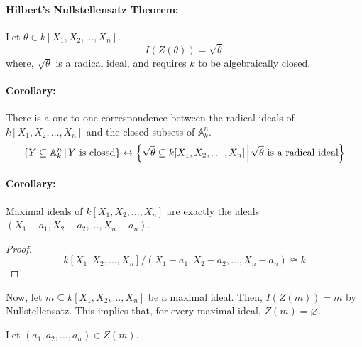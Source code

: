 \documentclass[12pt, oneside]{book}
\begin{document}
\paragraph{Hilbert's Nullstellensatz Theorem:} Let \(\theta \in k[X_1, X_2, \dots, X_n]\). 
\[I(Z(\theta)) = \sqrt{\theta}\]
where, \(\sqrt{\theta}\) is a radical ideal, and requires \(k\) to be algebraically closed.

\paragraph{Corollary:} There is a one-to-one correspondence between the radical ideals of \(k[X_1, X_2, \dots, X_n]\) and the closed subsets of \(\mathbb{A}_k^n\).
\[\left\{Y \subseteq \mathbb{A}_k^n \;\vline\; Y \textrm{ is closed} \right\} \leftrightarrow \left\{\sqrt{\theta} \subseteq k[X_1, X_2, \dots, X_n] \;\vline\; \sqrt{\theta} \textrm{ is a radical ideal} \right\}\]

\paragraph{Corollary:} Maximal ideals of \(k[X_1, X_2, \dots, X_n]\) are exactly the ideals \(\left(X_1 - a_1, X_2 - a_2, \dots, X_n - a_n\right)\).
\begin{proof}
    \[k[X_1, X_2, \dots, X_n] / (X_1 - a_1, X_2 - a_2, \dots, X_n - a_n) \cong k\]
\end{proof}
Now, let \(m \subseteq k[X_1, X_2, \dots, X_n]\) be a maximal ideal.
Then, \(I(Z(m)) = m\) by Nullstellensatz.
This implies that, for every maximal ideal, \(Z(m) = \varnothing\).

Let \((a_1, a_2, \dots, a_n) \in Z(m)\). 
\end{document}
